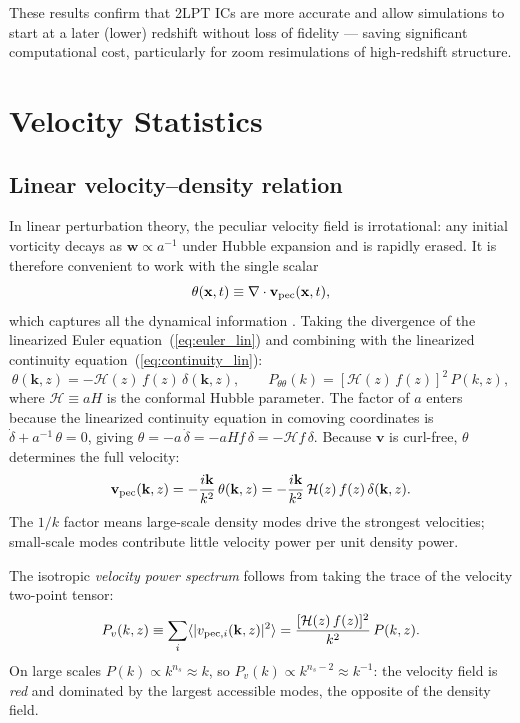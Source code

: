 \documentclass[12pt]{article}
\newcommand{\bx}{\mathbf{x}}
\newcommand{\bk}{\mathbf{k}}
\newcommand{\bv}{\mathbf{v}}
\newcommand{\calH}{\mathcal{H}}
\begin{document}
These results confirm that 2LPT ICs are more accurate and allow
simulations to start at a later (lower) redshift without loss of
fidelity — saving significant computational cost, particularly
for zoom resimulations of high-redshift structure.

\section{Velocity Statistics}
\label{sec:vel_stats}

\subsection{Linear velocity–density relation}
\label{sec:vel_linear}

In linear perturbation theory, the peculiar velocity field is
irrotational: any initial vorticity decays as $\mathbf{w}\propto a^{-1}$
under Hubble expansion and is rapidly erased.  It is therefore
convenient to work with the single scalar
%
\begin{equation}
  \theta(\bx,t) \equiv \nabla\cdot\bv_{\rm pec}(\bx,t),
  \label{eq:theta_def}
\end{equation}
%
which captures all the dynamical information \citep[][\S2.1]{Jeong2010}.
Taking the divergence of the linearized Euler
equation~(\ref{eq:euler_lin}) and combining with the linearized
continuity equation~(\ref{eq:continuity_lin}):
%
\begin{equation}
  \theta(\bk, z) = -\calH(z)\,f(z)\,\delta(\bk, z),
  \qquad
  P_{\theta\theta}(k) = [\calH(z)\,f(z)]^2\,P(k,z),
  \label{eq:theta_delta}
\end{equation}
%
where $\calH \equiv aH$ is the conformal Hubble parameter.  The factor
of $a$ enters because the linearized continuity equation in
comoving coordinates is $\dot\delta + a^{-1}\,\theta = 0$, giving
$\theta = -a\,\dot\delta = -aHf\,\delta = -\calH f\,\delta$.
Because $\bv$ is curl-free, $\theta$ determines the full velocity:
%
\begin{equation}
  \bv_{\rm pec}(\bk, z)
    = -\frac{i\bk}{k^2}\,\theta(\bk, z)
    = -\frac{i\bk}{k^2}\, \calH(z)\, f(z)\, \delta(\bk, z).
  \label{eq:vel_delta}
\end{equation}
%
The $1/k$ factor means large-scale density modes drive the strongest
velocities; small-scale modes contribute little velocity power per
unit density power.

The isotropic \emph{velocity power spectrum} follows from taking the
trace of the velocity two-point tensor:
%
\begin{equation}
  P_v(k, z) \equiv \sum_i \langle |v_{{\rm pec},i}(\bk, z)|^2 \rangle
    = \frac{[\calH(z)\, f(z)]^2}{k^2}\, P(k, z).
  \label{eq:pv}
\end{equation}
%
On large scales $P(k) \propto k^{n_s} \approx k$, so
$P_v(k) \propto k^{n_s - 2} \approx k^{-1}$: the velocity field is
\emph{red} and dominated by the largest accessible modes, the opposite
of the density field.
\end{document}

